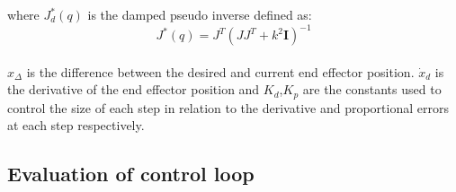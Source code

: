 \documentclass[11pt]{report}
\begin{document}
\noindent where $J^{\text{*}}_{d}(q) $ is the damped pseudo inverse defined as:
\begin{equation*}
    J^{\text{*}}(q) = J^{T}(JJ^{T} + \mathit{k}^{2}\mathbf{I})^{-1}
\end{equation*}\\

\noindent $x_{\Delta}$ is the difference between the desired and current end effector position.
\noindent $\dot{x}_{d}$ is the derivative of the end effector position and $K_{d}$,$K_{p}$ are the constants used to control the size of each step in relation to the derivative and proportional errors at each step respectively.

\subsection*{Evaluation of control loop}
\end{document}
